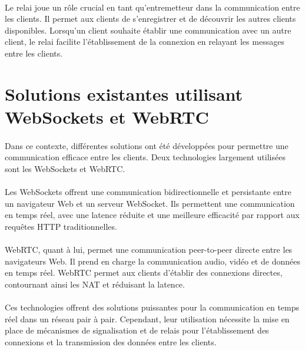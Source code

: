 \paragraph{}
Le relai joue un rôle crucial en tant qu'entremetteur dans la communication entre les clients. Il permet aux clients de s'enregistrer et de découvrir les autres clients disponibles. 
Lorsqu'un client souhaite établir une communication avec un autre client, le relai facilite l'établissement de la connexion en relayant les messages entre les clients.

\section{Solutions existantes utilisant WebSockets et WebRTC}

\paragraph{}
Dans ce contexte, différentes solutions ont été développées pour permettre une communication efficace entre les clients. Deux technologies largement utilisées sont les WebSockets et WebRTC.

\paragraph{}
Les WebSockets offrent une communication bidirectionnelle et persistante entre un navigateur Web et un serveur WebSocket. Ils permettent une communication en temps réel, avec une latence 
réduite et une meilleure efficacité par rapport aux requêtes HTTP traditionnelles.

\paragraph{}
WebRTC, quant à lui, permet une communication peer-to-peer directe entre les navigateurs Web. Il prend en charge la communication audio, vidéo et de données en temps réel. 
WebRTC permet aux clients d'établir des connexions directes, contournant ainsi les NAT et réduisant la latence.

\paragraph{}
Ces technologies offrent des solutions puissantes pour la communication en temps réel dans un réseau pair à pair. Cependant, leur utilisation nécessite la mise en place de mécanismes de 
signalisation et de relais pour l'établissement des connexions et la transmission des données entre les clients.


